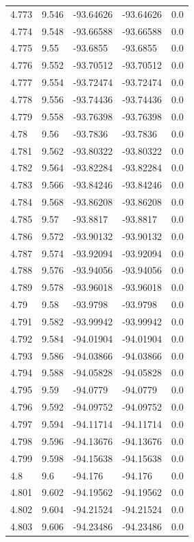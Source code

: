 \begin{tabular}{lllll}
4.773 & 9.546 & -93.64626 & -93.64626 & 0.0 \\
4.774 & 9.548 & -93.66588 & -93.66588 & 0.0 \\
4.775 & 9.55 & -93.6855 & -93.6855 & 0.0 \\
4.776 & 9.552 & -93.70512 & -93.70512 & 0.0 \\
4.777 & 9.554 & -93.72474 & -93.72474 & 0.0 \\
4.778 & 9.556 & -93.74436 & -93.74436 & 0.0 \\
4.779 & 9.558 & -93.76398 & -93.76398 & 0.0 \\
4.78 & 9.56 & -93.7836 & -93.7836 & 0.0 \\
4.781 & 9.562 & -93.80322 & -93.80322 & 0.0 \\
4.782 & 9.564 & -93.82284 & -93.82284 & 0.0 \\
4.783 & 9.566 & -93.84246 & -93.84246 & 0.0 \\
4.784 & 9.568 & -93.86208 & -93.86208 & 0.0 \\
4.785 & 9.57 & -93.8817 & -93.8817 & 0.0 \\
4.786 & 9.572 & -93.90132 & -93.90132 & 0.0 \\
4.787 & 9.574 & -93.92094 & -93.92094 & 0.0 \\
4.788 & 9.576 & -93.94056 & -93.94056 & 0.0 \\
4.789 & 9.578 & -93.96018 & -93.96018 & 0.0 \\
4.79 & 9.58 & -93.9798 & -93.9798 & 0.0 \\
4.791 & 9.582 & -93.99942 & -93.99942 & 0.0 \\
4.792 & 9.584 & -94.01904 & -94.01904 & 0.0 \\
4.793 & 9.586 & -94.03866 & -94.03866 & 0.0 \\
4.794 & 9.588 & -94.05828 & -94.05828 & 0.0 \\
4.795 & 9.59 & -94.0779 & -94.0779 & 0.0 \\
4.796 & 9.592 & -94.09752 & -94.09752 & 0.0 \\
4.797 & 9.594 & -94.11714 & -94.11714 & 0.0 \\
4.798 & 9.596 & -94.13676 & -94.13676 & 0.0 \\
4.799 & 9.598 & -94.15638 & -94.15638 & 0.0 \\
4.8 & 9.6 & -94.176 & -94.176 & 0.0 \\
4.801 & 9.602 & -94.19562 & -94.19562 & 0.0 \\
4.802 & 9.604 & -94.21524 & -94.21524 & 0.0 \\
4.803 & 9.606 & -94.23486 & -94.23486 & 0.0 \\

\end{tabular}

